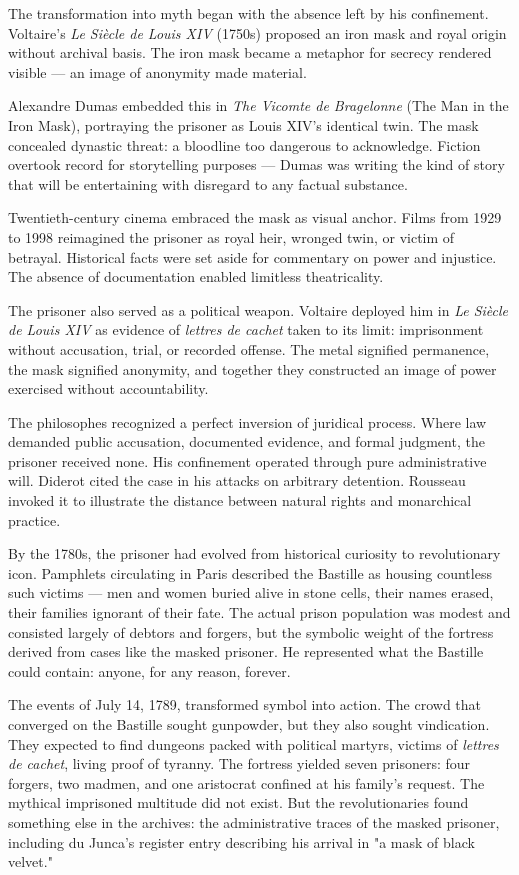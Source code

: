 The transformation into myth began with the absence left by his confinement. Voltaire's \textit{Le Siècle de Louis XIV} (1750s) proposed an iron mask and royal origin without archival basis. The iron mask became a metaphor for secrecy rendered visible — an image of anonymity made material.

Alexandre Dumas embedded this in \textit{The Vicomte de Bragelonne} (The Man in the Iron Mask), portraying the prisoner as Louis XIV's identical twin. The mask concealed dynastic threat: a bloodline too dangerous to acknowledge. Fiction overtook record for storytelling purposes — Dumas was writing the kind of story that will be entertaining with disregard to any factual substance.

Twentieth-century cinema embraced the mask as visual anchor. Films from 1929 to 1998 reimagined the prisoner as royal heir, wronged twin, or victim of betrayal. Historical facts were set aside for commentary on power and injustice. The absence of documentation enabled limitless theatricality.

The prisoner also served as a political weapon. Voltaire deployed him in \textit{Le Siècle de Louis XIV} as evidence of \textit{lettres de cachet} taken to its limit: imprisonment without accusation, trial, or recorded offense. The metal signified permanence, the mask signified anonymity, and together they constructed an image of power exercised without accountability.

The philosophes recognized a perfect inversion of juridical process. Where law demanded public accusation, documented evidence, and formal judgment, the prisoner received none. His confinement operated through pure administrative will. Diderot cited the case in his attacks on arbitrary detention. Rousseau invoked it to illustrate the distance between natural rights and monarchical practice.

By the 1780s, the prisoner had evolved from historical curiosity to revolutionary icon. Pamphlets circulating in Paris described the Bastille as housing countless such victims — men and women buried alive in stone cells, their names erased, their families ignorant of their fate. The actual prison population was modest and consisted largely of debtors and forgers, but the symbolic weight of the fortress derived from cases like the masked prisoner. He represented what the Bastille could contain: anyone, for any reason, forever.

The events of July 14, 1789, transformed symbol into action. The crowd that converged on the Bastille sought gunpowder, but they also sought vindication. They expected to find dungeons packed with political martyrs, victims of \textit{lettres de cachet}, living proof of tyranny. The fortress yielded seven prisoners: four forgers, two madmen, and one aristocrat confined at his family's request. The mythical imprisoned multitude did not exist. But the revolutionaries found something else in the archives: the administrative traces of the masked prisoner, including du Junca's register entry describing his arrival in "a mask of black velvet."

